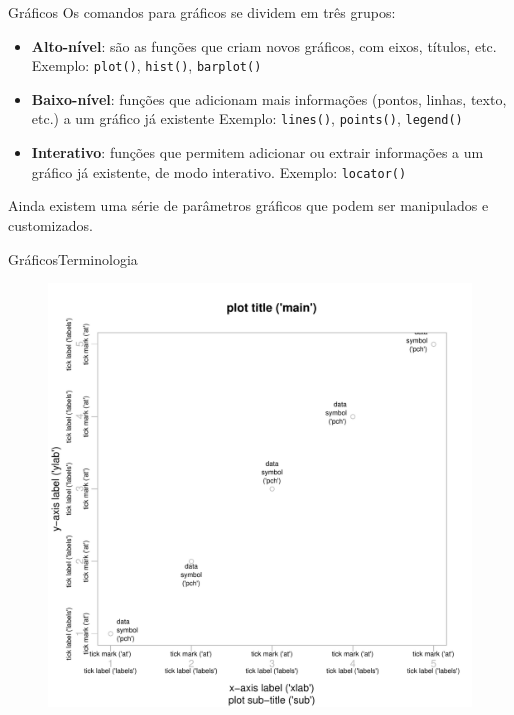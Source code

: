 \documentclass[10pt]{beamer}\usepackage[]{graphicx}\usepackage[]{color}
\begin{document}
\begin{frame}[fragile]{Gráficos}
Os comandos para gráficos se dividem em três grupos:
\begin{itemize}
\item \textbf{Alto-nível}: são as funções que criam novos gráficos, com
  eixos, títulos, etc. Exemplo: \texttt{plot()}, \texttt{hist()},
  \texttt{barplot()}
\item \textbf{Baixo-nível}: funções que adicionam mais informações
  (pontos, linhas, texto, etc.) a um gráfico já existente Exemplo:
  \texttt{lines()}, \texttt{points()}, \texttt{legend()}
\item \textbf{Interativo}: funções que permitem adicionar ou extrair
  informações a um gráfico já existente, de modo interativo. Exemplo:
  \texttt{locator()}
\end{itemize}
Ainda existem uma série de parâmetros gráficos que podem ser manipulados
e customizados.
\end{frame}

\begin{frame}[fragile]{Gráficos}{Terminologia}
\begin{figure}[htp]
\centering
\includegraphics[height=0.95\textheight]{figure/fig8m}
\end{figure}
\end{frame}
\end{document}
